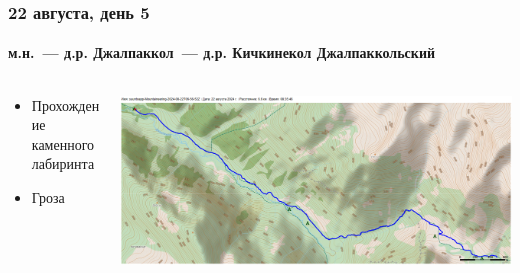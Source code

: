 \documentclass[
11pt, %
]{beamer}
\begin{document}
	
		\begin{frame}
		\frametitle{22 августа, день 5}
		\framesubtitle{м.н.~--- д.р. Джалпаккол~--- д.р. Кичкинекол Джалпаккольский} %
		\begin{columns}[c] %
			\begin{column}{0.45\textwidth} %
				\begin{itemize}
				\item Прохождение каменного лабиринта
				\item Гроза
				\end{itemize}
				
			\end{column}
			\begin{column}{0.5\textwidth} %
				\centering
				\includegraphics[width=\linewidth]{../pics/mini_maps/22}
			\end{column}
		\end{columns}
	\end{frame}
	
\end{document}
